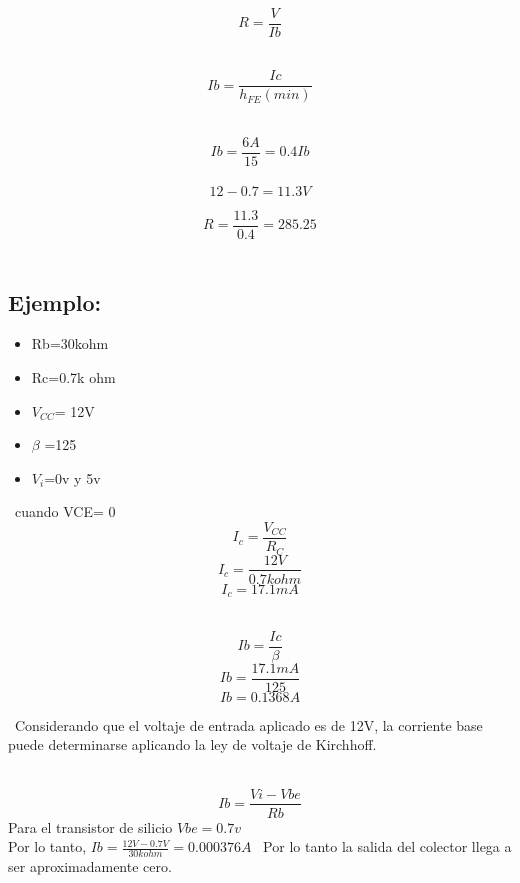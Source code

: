 \documentclass[14pt,letterpaper]{article}
\begin{document}
\

$$R=\frac{V}{Ib}$$
\

$$Ib=\frac{Ic}{h_{FE}(min)}$$

\
$$Ib=\frac{6A}{15}=0.4Ib$$
\
$$12-0.7=11.3V$$

$$R=\frac{11.3}{0.4}=285.25$$
\
\subsection{Ejemplo:}
\begin{itemize}
\item Rb=30kohm
\item Rc=0.7k ohm
\item $V_{CC}$= 12V
\item $\beta$ =125
\item $V_i$=0v y 5v

\end{itemize}

\
cuando VCE= 0
$$I_c= \frac{V_{CC}}{R_C}$$
$$I_c=\frac{12V}{0.7kohm}$$
$$I_c= 17.1mA$$

\
$$Ib= \frac{Ic}{\beta}$$
$$Ib=\frac{17.1mA}{125}$$
$$Ib=0.1368A$$

\
Considerando que el voltaje de entrada aplicado es de 12V, la corriente base puede determinarse aplicando la ley de voltaje de Kirchhoff.

\
$$Ib=\frac{Vi-Vbe}{Rb}$$
Para el transistor de silicio $Vbe=0.7v$\\ Por lo tanto, $Ib=\frac{12V-0.7V}{30kohm}= 0.000376A$
\
Por lo tanto la salida del colector llega a ser aproximadamente cero.
\end{document}
